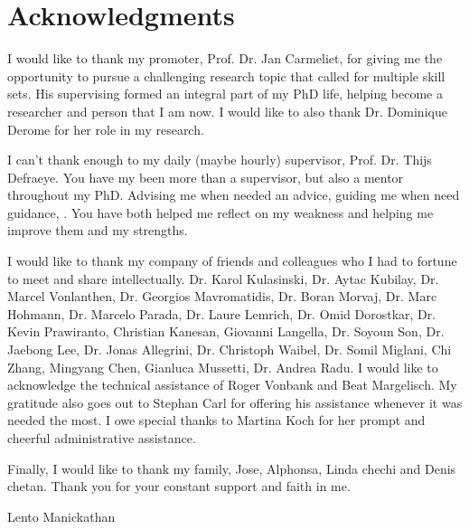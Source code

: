 

\chapter{Acknowledgments}

I would like to thank my promoter, Prof. Dr. Jan Carmeliet, for giving me the opportunity to pursue a challenging research topic that called for multiple skill sets. His supervising formed an integral part of my PhD life, helping become a researcher and person that I am now. I would like to also thank Dr. Dominique Derome for her role in my research. 

I can't thank enough to my daily (maybe hourly) supervisor, Prof. Dr. Thijs Defraeye. You have my been more than a supervisor, but also a mentor throughout my PhD. Advising me when needed an advice, guiding me when need guidance, . You have both helped me reflect on my weakness and helping me improve them and my strengths. 


I would like to thank my company of friends and colleagues who I had to fortune to meet and share intellectually. Dr. Karol Kulasinski, Dr. Aytac Kubilay, Dr. Marcel Vonlanthen, Dr. Georgios Mavromatidis, Dr. Boran Morvaj, Dr. Marc Hohmann, Dr. Marcelo Parada, Dr. Laure Lemrich, Dr. Omid Dorostkar, Dr. Kevin Prawiranto, Christian Kanesan, Giovanni Langella, Dr. Soyoun Son, Dr. Jaebong Lee, Dr. Jonas Allegrini, Dr. Christoph Waibel, Dr. Somil Miglani, Chi Zhang, Mingyang Chen, Gianluca Mussetti, Dr. Andrea Radu. I would like to acknowledge the technical assistance of Roger Vonbank and Beat Margelisch. My gratitude also goes out to Stephan Carl for offering his assistance whenever it was needed the most. I owe special thanks to Martina Koch for her prompt and cheerful administrative assistance.

Finally, I would like to thank my family, Jose, Alphonsa, Linda chechi and Denis chetan. Thank you for your constant support and faith in me.

\begin{flushright}
Lento Manickathan\\
\myMonthYear
\end{flushright}    
	

